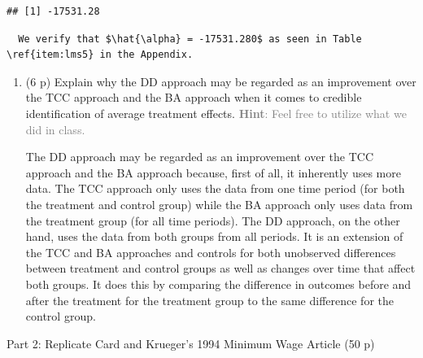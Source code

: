 \documentclass[
]{article}
\newenvironment{Shaded}{\begin{snugshade}}{\end{snugshade}}
\newcommand{\FunctionTok}[1]{\textcolor[rgb]{0.13,0.29,0.53}{\textbf{#1}}}
\newcommand{\NormalTok}[1]{#1}
\newcommand{\SpecialCharTok}[1]{\textcolor[rgb]{0.81,0.36,0.00}{\textbf{#1}}}
\begin{document}
\begin{Shaded}
\end{Shaded}

\begin{verbatim}
## [1] -17531.28
\end{verbatim}

\begin{verbatim}
  We verify that $\hat{\alpha} = -17531.280$ as seen in Table \ref{item:lms5} in the Appendix. 
\end{verbatim}

\begin{enumerate}
\def\labelenumi{\arabic{enumi}.}
\setcounter{enumi}{7}
\item
  (6 p) Explain why the DD approach may be regarded as an improvement
  over the TCC approach and the BA approach when it comes to credible
  identification of average treatment effects.
  \textcolor{gray}{\textbf{Hint}: Feel free to utilize what we did in class.}

  The DD approach may be regarded as an improvement over the TCC
  approach and the BA approach because, first of all, it inherently uses
  more data. The TCC approach only uses the data from one time period
  (for both the treatment and control group) while the BA approach only
  uses data from the treatment group (for all time periods). The DD
  approach, on the other hand, uses the data from both groups from all
  periods. It is an extension of the TCC and BA approaches and controls
  for both unobserved differences between treatment and control groups
  as well as changes over time that affect both groups. It does this by
  comparing the difference in outcomes before and after the treatment
  for the treatment group to the same difference for the control group.
  \newpage
\end{enumerate}

\begin{center}
{\LARGE Part 2: Replicate Card and Krueger's 1994 Minimum Wage Article (50 p)}
\end{center}
\end{document}
